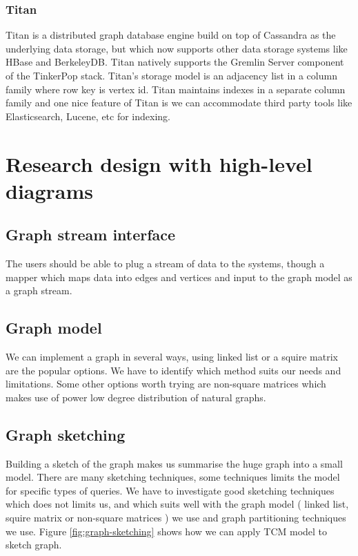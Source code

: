 \documentclass[12pt]{article}
\begin{document}
\subsubsection{Titan}
Titan is a distributed graph database engine build on top of Cassandra as the underlying data storage, but which now supports other data storage systems like HBase and BerkeleyDB. Titan natively supports the Gremlin Server component of the TinkerPop stack. Titan’s storage model is an adjacency list in a column family where row key is vertex id. Titan maintains indexes in a separate column family and one nice feature of Titan is we can accommodate third party tools like Elasticsearch, Lucene, etc for indexing.

\clearpage 
\section{Research design with high-level diagrams}

\subsection{Graph stream interface}
The users should be able to plug a stream of data to the systems, though a mapper which maps data into  edges and vertices and input to the graph model as a graph stream. 

\subsection{Graph model}
We can implement a graph in several ways, using linked list or a squire matrix are the popular options. We have to identify which method suits our needs and limitations. Some other options worth trying are non-square matrices which makes use of power low degree distribution of natural graphs. 

\subsection{Graph sketching}
Building a sketch of the graph makes us summarise the huge graph into a small model. There are many sketching techniques, some techniques limits the model for specific types of queries. We have to investigate good sketching techniques which does not limits us, and which suits well with the graph model ( linked list, squire matrix or non-square matrices ) we use and graph partitioning techniques we use. Figure \ref{fig:graph-sketching} shows how we can apply TCM \cite{TCM} model to sketch  graph. 
\end{document}
